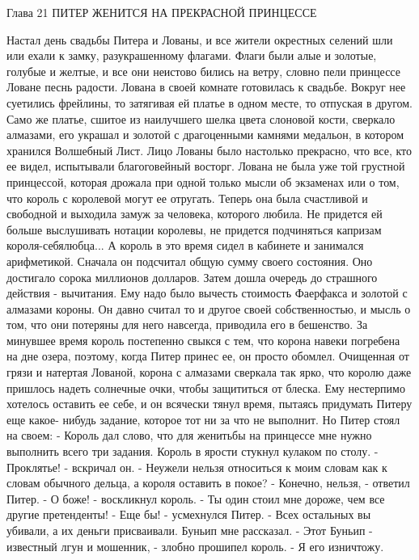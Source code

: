 Глава 21
        ПИТЕР ЖЕНИТСЯ НА ПРЕКРАСНОЙ ПРИНЦЕССЕ

    Настал день свадьбы Питера и Лованы, и все жители окрестных 
селений шли или ехали к замку, разукрашенному флагами. Флаги были алые 
и золотые, голубые и желтые, и все они неистово бились на ветру, 
словно пели принцессе Ловане песнь радости.
    Лована в своей комнате готовилась к свадьбе. Вокруг нее суетились 
фрейлины, то затягивая ей платье в одном месте, то отпуская в другом. 
Само же платье, сшитое из наилучшего шелка цвета слоновой кости, 
сверкало алмазами, его украшал и золотой с драгоценными камнями 
медальон, в котором хранился Волшебный Лист. Лицо Лованы было 
настолько прекрасно, что все, кто ее видел, испытывали благоговейный 
восторг.
    Лована не была уже той грустной принцессой, которая дрожала при 
одной только мысли об экзаменах или о том, что король с королевой 
могут ее отругать. Теперь она была счастливой и свободной и выходила 
замуж за человека, которого любила. Не придется ей больше выслушивать 
нотации королевы, не придется подчиняться капризам короля-себялюбца...
    А король в это время сидел в кабинете и занимался арифметикой. 
Сначала он подсчитал общую сумму своего состояния. Оно достигало 
сорока миллионов долларов. Затем дошла очередь до страшного действия - 
вычитания. Ему надо было вычесть стоимость Фаерфакса и золотой с 
алмазами короны. Он давно считал то и другое своей собственностью, и 
мысль о том, что они потеряны для него навсегда, приводила его в 
бешенство.
    За минувшее время король постепенно свыкся с тем, что корона 
навеки погребена на дне озера, поэтому, когда Питер принес ее, он 
просто обомлел. Очищенная от грязи и натертая Лованой, корона с 
алмазами сверкала так ярко, что королю даже пришлось надеть солнечные 
очки, чтобы защититься от блеска. Ему нестерпимо хотелось оставить ее 
себе, и он всячески тянул время, пытаясь придумать Питеру еще какое-
нибудь задание, которое тот ни за что не выполнит.
    Но Питер стоял на своем:
    - Король дал слово, что для женитьбы на принцессе мне нужно 
выполнить всего три задания.
    Король в ярости стукнул кулаком по столу.
    - Проклятье! - вскричал он. - Неужели нельзя относиться к моим 
словам как к словам обычного дельца, а короля оставить в покое?
    - Конечно, нельзя, - ответил Питер.
    - О боже! - воскликнул король. - Ты один стоил мне дороже, чем все 
другие претенденты!
    - Еще бы! - усмехнулся Питер. - Всех остальных вы убивали, а их 
деньги присваивали. Буньип мне рассказал.
    - Этот Буньип - известный лгун и мошенник, - злобно прошипел 
король. - Я его изничтожу.
